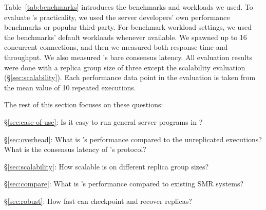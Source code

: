 Table~\ref{tab:benchmarks} introduces the benchmarks and workloads we used. To 
evaluate \xxx's practicality, we used the server developers' own performance 
benchmarks or popular third-party. For benchmark workload settings, we used the 
benchmarks' default workloads whenever available. We spawned up to 16 
concurrent connections, and then we measured both response time and 
throughput. We also measured \xxx's bare consensus latency. All evaluation 
results were done with a replica group size of three except the scalability 
evaluation (\S\ref{sec:scalability}). Each performance data point in the 
evaluation is taken from the mean value of 10 repeated executions.

The rest of this section focuses on these questions:

\begin{tightenum}

\item[\S\ref{sec:ease-of-use}:] Is it easy to run general server programs 
in \xxx?

\item[\S\ref{sec:overhead}:] What is \xxx's performance compared to the 
unreplicated executions? What is the consensus latency of \xxx's \paxos 
protocol?

\item[\S\ref{sec:scalability}:] How scalable is \xxx on different replica group 
sizes?

\item[\S\ref{sec:compare}:] What is \xxx's performance compared to existing 
SMR systems?

\item[\S\ref{sec:robust}:] How fast can \xxx checkpoint and recover replicas?



\end{tightenum}


